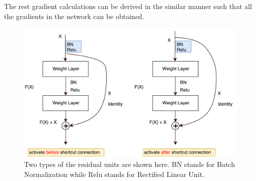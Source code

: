 The rest gradient calculations can be derived 
in the similar manner such that all the gradients 
in the network can be obtained.
% 
\begin{figure}
    \centering
    \includegraphics[width=\textwidth,height=\textheight,keepaspectratio]{Figures/basic-resnet-structure.pdf}
    \caption[Two types of the residual units]{
        Two types of the residual units are shown here.
        BN stands for Batch Normalization while
        Relu stands for Rectified Linear Unit.
        }\label{fig:basic-resnet-structure}
\end{figure}

